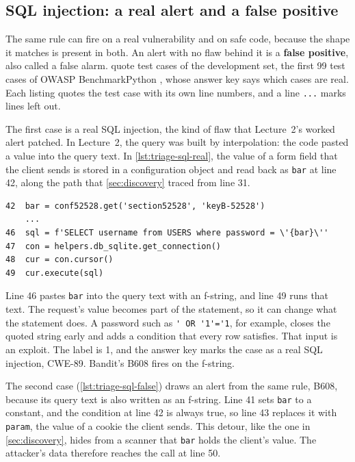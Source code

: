 \subsection{SQL injection: a real alert and a false positive}
\label{sec:triage-sql}

The same rule can fire on a real vulnerability and on safe code, because the shape it matches is
present in both. An alert with no flaw behind it is a \textbf{false positive}, also called a false
alarm.  quote test cases of the development set,
the first 99 test cases of OWASP BenchmarkPython \citep{owasp-benchmarkpython}, whose answer key says
which cases are real. Each listing quotes the test case with its own line numbers, and a line
\texttt{...} marks lines left out.

The first case is a real SQL injection, the kind of flaw that Lecture~2's worked alert patched. In
Lecture~2, the query was built by interpolation: the code pasted a value into the query text. In
\cref{lst:triage-sql-real}, the value of a form field that the client sends is stored in a
configuration object and read back as \texttt{bar} at line 42, along the path that
\cref{sec:discovery} traced from line 31.

\noindent\begin{minipage}{\linewidth}
\begin{lstlisting}[breakatwhitespace=true, basicstyle=\ttfamily\footnotesize, caption={A real SQL injection: BenchmarkTest00099, lines 42 to 49.}, label=lst:triage-sql-real]
42  bar = conf52528.get('section52528', 'keyB-52528')
    ...
46  sql = f'SELECT username from USERS where password = \'{bar}\''
47  con = helpers.db_sqlite.get_connection()
48  cur = con.cursor()
49  cur.execute(sql)
\end{lstlisting}
\end{minipage}

Line 46 pastes \texttt{bar} into the query text with an f-string, and line 49 runs that text. The
request's value becomes part of the statement, so it can change what the statement does. A password
such as \lstinline|' OR '1'='1|, for example, closes the quoted string early and adds a condition that
every row satisfies. That input is an exploit. The label is 1, and the answer key marks the case as
a real SQL injection, CWE-89. Bandit's B608 fires on the f-string.

The second case (\cref{lst:triage-sql-false}) draws an alert from the same rule, B608, because its
query text is also written as an f-string. Line 41 sets \texttt{bar} to a constant, and the condition
at line 42 is always true, so line 43 replaces it with \texttt{param}, the value of a cookie the
client sends. This detour, like the one in \cref{sec:discovery}, hides from a scanner that
\texttt{bar} holds the client's value. The attacker's data therefore reaches the call at line 50.


